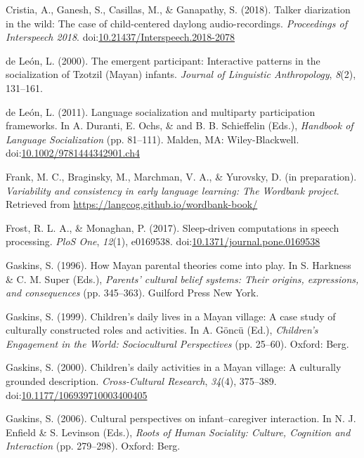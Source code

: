 \documentclass[floatsintext,man]{apa6}
\theoremstyle{definition}
\theoremstyle{definition}
\theoremstyle{definition}
\theoremstyle{remark}
\begin{document}
\hypertarget{ref-cristia2018talker}{}
Cristia, A., Ganesh, S., Casillas, M., \& Ganapathy, S. (2018). Talker
diarization in the wild: The case of child-centered daylong
audio-recordings. \emph{Proceedings of Interspeech 2018}.
doi:\href{https://doi.org/10.21437/Interspeech.2018-2078}{10.21437/Interspeech.2018-2078}

\hypertarget{ref-deleon2000emergent}{}
de León, L. (2000). The emergent participant: Interactive patterns in
the socialization of Tzotzil (Mayan) infants. \emph{Journal of
Linguistic Anthropology}, \emph{8}(2), 131--161.

\hypertarget{ref-deleon2011language}{}
de León, L. (2011). Language socialization and multiparty participation
frameworks. In A. Duranti, E. Ochs, \& and B. B. Schieffelin (Eds.),
\emph{Handbook of Language Socialization} (pp. 81--111). Malden, MA:
Wiley-Blackwell.
doi:\href{https://doi.org/10.1002/9781444342901.ch4}{10.1002/9781444342901.ch4}

\hypertarget{ref-frankIPvariability}{}
Frank, M. C., Braginsky, M., Marchman, V. A., \& Yurovsky, D. (in
preparation). \emph{Variability and consistency in early language
learning: The Wordbank project}. Retrieved from
\url{https://langcog.github.io/wordbank-book/}

\hypertarget{ref-frost2017sleep}{}
Frost, R. L. A., \& Monaghan, P. (2017). Sleep-driven computations in
speech processing. \emph{PloS One}, \emph{12}(1), e0169538.
doi:\href{https://doi.org/10.1371/journal.pone.0169538}{10.1371/journal.pone.0169538}

\hypertarget{ref-gaskins1996how}{}
Gaskins, S. (1996). How Mayan parental theories come into play. In S.
Harkness \& C. M. Super (Eds.), \emph{Parents' cultural belief systems:
Their origins, expressions, and consequences} (pp. 345--363). Guilford
Press New York.

\hypertarget{ref-gaskins1999childrens}{}
Gaskins, S. (1999). Children's daily lives in a Mayan village: A case
study of culturally constructed roles and activities. In A. Göncü (Ed.),
\emph{Children's Engagement in the World: Sociocultural Perspectives}
(pp. 25--60). Oxford: Berg.

\hypertarget{ref-gaskins2000childrens}{}
Gaskins, S. (2000). Children's daily activities in a Mayan village: A
culturally grounded description. \emph{Cross-Cultural Research},
\emph{34}(4), 375--389.
doi:\href{https://doi.org/10.1177/106939710003400405}{10.1177/106939710003400405}

\hypertarget{ref-gaskins2006cultural}{}
Gaskins, S. (2006). Cultural perspectives on infant--caregiver
interaction. In N. J. Enfield \& S. Levinson (Eds.), \emph{Roots of
Human Sociality: Culture, Cognition and Interaction} (pp. 279--298).
Oxford: Berg.
\end{document}
